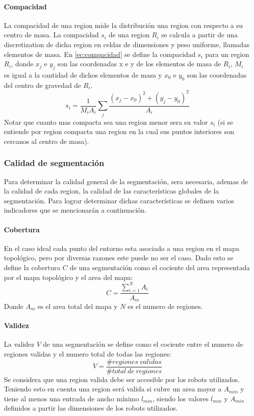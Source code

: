 \paragraph{Compacidad}
La compacidad de una region mide la distribución una region con respecto a su centro de masa. La compacidad $s_i$ de una region $R_i$ se calcula a partir de una discretization de dicha region en celdas de dimensiones y peso uniforme, llamadas elementos de masa. En \eqref{ec:compacidad} se define la compacidad $s_i$ para un region $R_i$, donde $x_j$ e $y_j$ son las coordenadas x e y de los elementos de masa de $R_i$, $M_i$ es igual a la cantidad de dichos elementos de masa y $x_0$ e $y_0$ son las coordenadas del centro de gravedad de $R_i$.
\begin{equation}
  s_i=\frac{1}{M_iA_i}\sum_j \frac{(x_j-x_0)^2 + (y_j-y_0)^2}{A_i} \label{ec:compacidad}
\end{equation}
Notar que cuanto mas compacta sea una region menor sera su valor $s_i$ (si se entiende por region compacta una region en la cual sus puntos interiores son cercanos al centro de masa).

\subsubsection{Calidad de segmentación}
Para determinar la calidad general de la segmentación, sera necesaria, ademas de la calidad de cada region, la calidad de las características globales de la segmentación. Para lograr determinar dichas características se definen varios indicadores que se mencionarán a continuación.

\paragraph{Cobertura}
En el caso ideal cada punto del entorno esta asociado a una region en el mapa topológico, pero por diversas razones este puede no ser el caso. Dado esto se define la cobertura $C$ de una segmentación como el cociente del area representada por el mapa topológico y el area del mapa:
\begin{equation}
C=\frac{\sum^N_{i=1} A_i}{A_m}
\end{equation}
Donde $A_m$ es el area total del mapa y $N$ es el numero de regiones.

\paragraph{Validez}
La validez $V$ de una segmentación se define como el cociente entre el numero de regiones validas y el numero total de todas las regiones:
\begin{equation}
  V=\frac{\#regiones\ validas}{\#total\ de\ regiones}
\end{equation}
Se considera que una region valida debe ser accesible por los robots utilizados. Teniendo esto en cuenta una region será valida si cubre un area mayor a $A_{min}$ y tiene al menos una entrada de ancho mínimo $l_{min}$, siendo los valores $l_{min}$ y $A_{min}$ definidos a partir las dimensiones de los robots utilizados.

